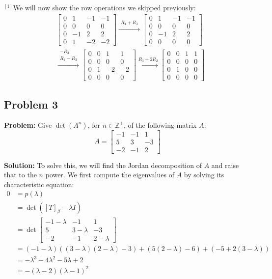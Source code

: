 \documentclass{article}
\begin{document}
$\phantom{}^{[1]}$We will now show the row operations we skipped previously:
\begin{align*} 
  &\left[\begin{array}{rrrr}
    0&1&-1&-1\\
    0&0&0&0\\
    0&-1&2&2\\
    0&1&-2&-2
    \end{array} \right]
    \xrightarrow{\substack{R_4+R_3}} 
    \left[\begin{array}{rrrr}
      0&1&-1&-1\\
      0&0&0&0\\
      0&-1&2&2\\
      0&0&0&0
    \end{array} \right]\\
    &\xrightarrow{\substack{-R_3\\ R_1-R_3}} 
    \left[\begin{array}{rrrr}
      0&0&1&1\\
      0&0&0&0\\
      0&1&-2&-2\\
      0&0&0&0
    \end{array} \right]
    \xrightarrow{R_3+2R_2}
    \left[\begin{array}{rrrr} 
      0&0&1&1\\
      0&0&0&0\\
      0&1&0&0\\
      0&0&0&0
    \end{array} \right]
\end{align*}
\newpage

\subsection*{Problem 3}
\noindent\textbf{Problem:} Give $\operatorname{det}(A^n)$, for $n\in\mathbb Z^+$, of the following matrix $A$:
$$A=\begin{bmatrix}
  -1&-1&1\\5&3&-3\\-2&-1&2
\end{bmatrix}$$
\smallskip

\noindent\textbf{Solution:} To solve this, we will find the Jordan decomposition of $A$ and raise that to the $n$ power. We first compute the eigenvalues of $A$ by solving its characteristic equation:
\begin{align*}
  0&=p(\lambda)\\
  &=\operatorname{det}([T]_\beta-\lambda I)\\
  &=\operatorname{det}\begin{bmatrix}
    -1-\lambda&-1&1\\5&3-\lambda&-3\\-2&-1&2-\lambda
  \end{bmatrix}\\
  &=(-1-\lambda)((3-\lambda)(2-\lambda)-3)+(5(2-\lambda)-6)+(-5+2(3-\lambda))\\
  &=-\lambda^3+4\lambda^2-5\lambda+2\\
  &=-(\lambda-2)(\lambda-1)^2
\end{align*}
\end{document}
